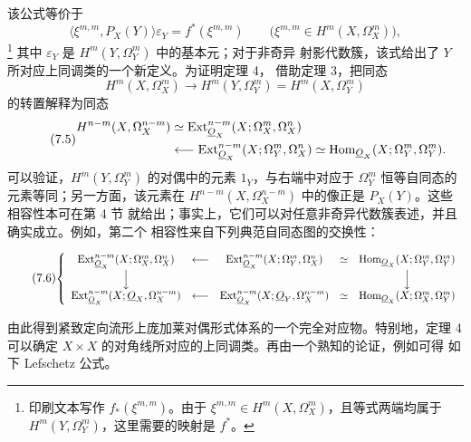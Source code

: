 该公式等价于
\begin{equation}\tag{7.4 bis}
  \bigl\langle\xi^{m,m},P_X(Y)\bigr\rangle\varepsilon_Y
  =f^{*}(\xi^{m,m})
  \qquad
  \bigl(\xi^{m,m}\in H^{m}(X,\Omega_X^{m})\bigr),
\end{equation}
\footnote{印刷文本写作 $f_{*}(\xi^{m,m})$。由于
$\xi^{m,m}\in H^{m}(X,\Omega_X^{m})$，且等式两端均属于
$H^{m}(Y,\Omega_Y^{m})$，这里需要的映射是 $f^{*}$。}
其中 $\varepsilon_Y$ 是 $H^{m}(Y,\Omega_Y^{m})$ 中的基本元；对于非奇异
射影代数簇，该式给出了 $Y$ 所对应上同调类的一个新定义。为证明定理 4，
借助定理 3，把同态
\[
  H^{m}(X,\Omega_X^{m})
  \longrightarrow H^{m}(Y,\Omega_Y^{m})
  =H^{m}(X,\Omega_Y^{m})
\]
的转置解释为同态
\begin{equation}\tag{7.5}
\begin{split}
  H^{n-m}(X,\Omega_X^{n-m})
  &\simeq
  \operatorname{Ext}_{\underline{O}_X}^{n-m}(X;\Omega_X^{m},\Omega_X^{n})\\
  &\longleftarrow
  \operatorname{Ext}_{\underline{O}_X}^{n-m}(X;\Omega_Y^{m},\Omega_X^{n})
  \simeq
  \operatorname{Hom}_{\underline{O}_X}(X;\Omega_Y^{m},\Omega_Y^{m}).
\end{split}
\end{equation}
可以验证，$H^{m}(Y,\Omega_Y^{m})$ 的对偶中的元素 $1_Y$，与右端中对应于
$\Omega_Y^{m}$ 恒等自同态的元素等同；另一方面，该元素在
$H^{n-m}(X,\Omega_X^{n-m})$ 中的像正是 $P_X(Y)$。这些相容性本可在第 4 节
就给出；事实上，它们可以对任意非奇异代数簇表述，并且确实成立。例如，第二个
相容性来自下列典范自同态图的交换性：

\begin{equation}\tag{7.6}
\resizebox{\textwidth}{!}{$
\left\{
\begin{array}{ccccc}
\operatorname{Ext}_{\Osh_X}^{n-m}(X;\Omega_X^{m},\Omega_X^{n})
&\longleftarrow&
\operatorname{Ext}_{\Osh_X}^{n-m}(X;\Omega_Y^{m},\Omega_X^{n})
&\simeq&
\operatorname{Hom}_{\Osh_X}(X;\Omega_Y^{m},\Omega_Y^{m})\\[3pt]
\Big\downarrow&&&&\Big\downarrow\\[3pt]
\operatorname{Ext}_{\Osh_X}^{n-m}(X;\Osh_X,\Omega_X^{n-m})
&\longleftarrow&
\operatorname{Ext}_{\Osh_X}^{n-m}(X;\Osh_Y,\Omega_X^{n-m})
&\simeq&
\operatorname{Hom}_{\Osh_X}(X;\Omega_X^{m},\Omega_Y^{m})
\end{array}
\right.
$}
\end{equation}

由此得到紧致定向流形上庞加莱对偶形式体系的一个完全对应物。特别地，定理 4
可以确定 $X\times X$ 的对角线所对应的上同调类。再由一个熟知的论证，例如可得
如下 Lefschetz 公式。

